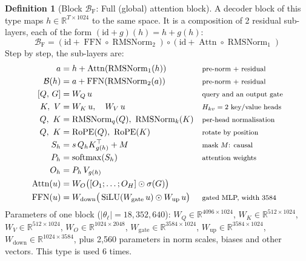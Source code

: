 \documentclass[10pt,a4paper]{article}
\newcommand{\op}[1]{\operatorname{#1}}
\theoremstyle{definition}
\newtheorem{definition}{Definition}[section]
\begin{document}
\begin{definition}[Block $\mathcal{B}_{\mathrm{F}}$: Full (global) attention block]
A decoder block of this type maps $h\in\mathbb{R}^{T\times 1024}$ to the same space. It is a composition of 2 residual sub-layers, each of the form $(\mathrm{id}+g)(h)=h+g(h)$:
\begin{equation}
  \mathcal{B}_{\mathrm{F}} = (\mathrm{id}+\op{FFN}\circ \op{RMSNorm}_{2})\circ(\mathrm{id}+\op{Attn}\circ \op{RMSNorm}_{1})
\end{equation}
Step by step, the sub-layers are:
\begin{align*}
  a &= h + \op{Attn}(\op{RMSNorm}_{1}(h)) && \text{\footnotesize pre-norm + residual} \\
  \mathcal{B}(h) &= a + \op{FFN}(\op{RMSNorm}_{2}(a)) && \text{\footnotesize pre-norm + residual} \\
  [Q,\,G] &= W_Q\,u && \text{\footnotesize query and an output gate} \\
  K,\ V &= W_K\,u,\quad W_V\,u && \text{\footnotesize $H_{kv}=2$ key/value heads} \\
  Q,\ K &= \op{RMSNorm}_q(Q),\ \op{RMSNorm}_k(K) && \text{\footnotesize per-head normalisation} \\
  Q,\ K &= \op{RoPE}(Q),\ \op{RoPE}(K) && \text{\footnotesize rotate by position} \\
  S_h &= s\, Q_h K_{g(h)}^{\top} + M && \text{\footnotesize mask $M$: causal} \\
  P_h &= \op{softmax}(S_h) && \text{\footnotesize attention weights} \\
  O_h &= P_h\, V_{g(h)} \\
  \op{Attn}(u) &= W_O\big([O_1;\dots;O_H]\odot\sigma(G)\big) \\
  \op{FFN}(u) &= W_{\mathrm{down}}\big(\op{SiLU}(W_{\mathrm{gate}}\,u)\odot W_{\mathrm{up}}\,u\big) && \text{\footnotesize gated MLP, width 3584}
\end{align*}
Parameters of one block ($|\theta_\ell|=18{,}352{,}640$): $W_Q\in\mathbb{R}^{4096\times1024}$, $W_K\in\mathbb{R}^{512\times1024}$, $W_V\in\mathbb{R}^{512\times1024}$, $W_O\in\mathbb{R}^{1024\times2048}$, $W_{\mathrm{gate}}\in\mathbb{R}^{3584\times1024}$, $W_{\mathrm{up}}\in\mathbb{R}^{3584\times1024}$, $W_{\mathrm{down}}\in\mathbb{R}^{1024\times3584}$, plus 2,560 parameters in norm scales, biases and other vectors. This type is used 6 times.
\end{definition}
\end{document}
